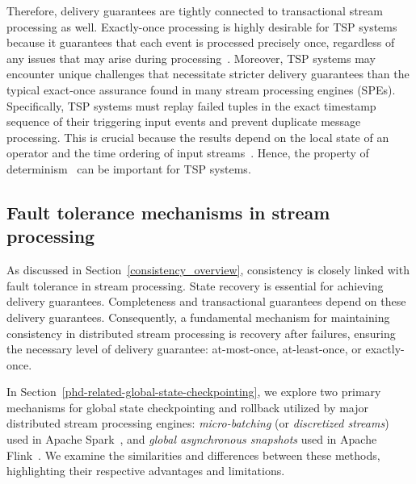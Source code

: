 Therefore, delivery guarantees are tightly connected to transactional stream processing as well. Exactly-once processing is highly desirable for TSP systems because it guarantees that each event is processed precisely once, regardless of any issues that may arise during processing~\cite{zhang2024survey}. Moreover, TSP systems may encounter unique challenges that necessitate stricter delivery guarantees than the typical exact-once assurance found in many stream processing engines (SPEs). Specifically, TSP systems must replay failed tuples in the exact timestamp sequence of their triggering input events and prevent duplicate message processing. This is crucial because the results depend on the local state of an operator and the time ordering of input streams~\cite{zhang2024survey}. Hence, the property of determinism~\cite{thepaper, Zacheilas:2017:MDS:3093742.3093921, palyvos2022research} can be important for TSP systems.


\subsection{Fault tolerance mechanisms in stream processing}
\label{phd-related-fault-tolerance}

As discussed in Section~\ref{consistency_overview}, consistency is closely linked with fault tolerance in stream processing. State recovery is essential for achieving delivery guarantees. Completeness and transactional guarantees depend on these delivery guarantees. Consequently, a fundamental mechanism for maintaining consistency in distributed stream processing is recovery after failures, ensuring the necessary level of delivery guarantee: at-most-once, at-least-once, or exactly-once.

In Section~\ref{phd-related-global-state-checkpointing}, we explore two primary mechanisms for global state checkpointing and rollback utilized by major distributed stream processing engines: {\em micro-batching} (or {\em discretized streams}) used in Apache Spark~\cite{Zaharia:2012:DSE:2342763.2342773}, and {\em global asynchronous snapshots} used in Apache Flink~\cite{2015arXiv150608603C, Carbone:2017:SMA:3137765.3137777}. We examine the similarities and differences between these methods, highlighting their respective advantages and limitations.

